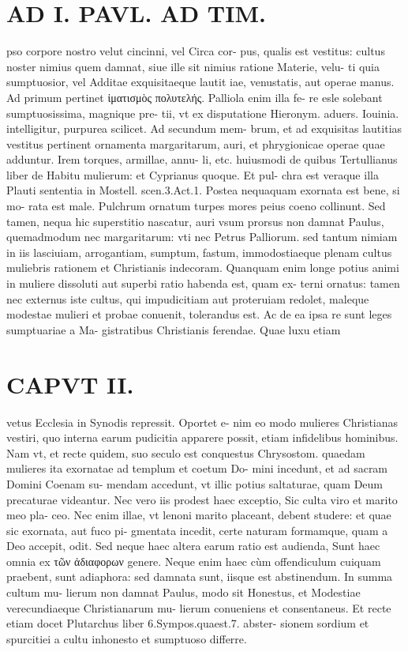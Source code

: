 \documentclass{article}
\begin{document}
\begin{pages}
\section*{AD I. PAVL. AD TIM. }
\marginpar{[ p.80 ]}\pstart pso corpore nostro velut cincinni, vel Circa cor- pus, qualis est vestitus: cultus noster nimius quem damnat, siue ille sit nimius ratione Materie, velu- ti quia sumptuosior, vel Additae exquisitaeque lautit iae, venustatis, aut operae manus. Ad primum pertinet ἰματισμὸς πολυτελής. Palliola enim illa fe- re esle solebant sumptuosissima, magnique pre- tii, vt ex disputatione Hieronym. aduers. Iouinia. intelligitur, purpurea scilicet. Ad secundum mem- brum, et ad exquisitas lautitias vestitus pertinent ornamenta margaritarum, auri, et phrygionicae operae quae adduntur. Irem torques, armillae, annu- li, etc. huiusmodi de quibus Tertullianus liber  de Habitu mulierum: et Cyprianus quoque. Et pul- chra est veraque illa Plauti sententia in Mostell. scen.3.Act.1.  \pend\pstart Postea nequaquam exornata est bene, si mo- rata est male.  \pend\pstart Pulchrum ornatum turpes mores peius coeno collinunt.  \pend\pstart Sed tamen, nequa hic superstitio nascatur, auri vsum prorsus non damnat Paulus, quemadmodum nec margaritarum: vti nec Petrus Palliorum. sed tantum nimiam in iis lasciuiam, arrogantiam, sumptum, fastum, immodostiaeque plenam cultus muliebris rationem et Christianis indecoram. Quanquam enim longe potius animi in muliere dissoluti aut superbi ratio habenda est, quam ex- terni ornatus: tamen nec externus iste cultus, qui impudicitiam aut proteruiam redolet, maleque modestae mulieri et probae conuenit, tolerandus est. Ac de ea ipsa re sunt leges sumptuariae a Ma- gistratibus Christianis ferendae. Quae luxu etiam  \pend
\section*{CAPVT II. }
\marginpar{[ p.81 ]}\pstart vetus Ecclesia in Synodis repressit. Oportet e- nim eo modo mulieres Christianas vestiri, quo interna earum pudicitia apparere possit, etiam infidelibus hominibus. Nam vt, et recte quidem, suo seculo est conquestus Chrysostom. quaedam mulieres ita exornatae ad templum et coetum Do- mini incedunt, et ad sacram Domini Coenam su- mendam accedunt, vt illic potius saltaturae, quam Deum precaturae videantur. Nec vero iis prodest haec exceptio, Sic culta viro et marito meo pla- ceo. Nec enim illae, vt lenoni marito placeant, debent studere: et quae sic exornata, aut fuco pi- gmentata incedit, certe naturam formamque, quam a Deo accepit, odit. Sed neque haec altera earum ratio est audienda, Sunt haec omnia ex τῶν ἀδιαφορων genere. Neque  enim haec cùm offendiculum cuiquam praebent, sunt adiaphora: sed damnata sunt, iisque  est abstinendum. In summa cultum mu- lierum non damnat Paulus, modo sit Honestus, et Modestiae verecundiaeque Christianarum mu- lierum conueniens et consentaneus. Et recte etiam docet Plutarchus liber 6.Sympos.quaest.7. abster- sionem sordium et spurcitiei a cultu inhonesto et sumptuoso differre.  \pend
{}
{}

\end{pages}
\end{document}
